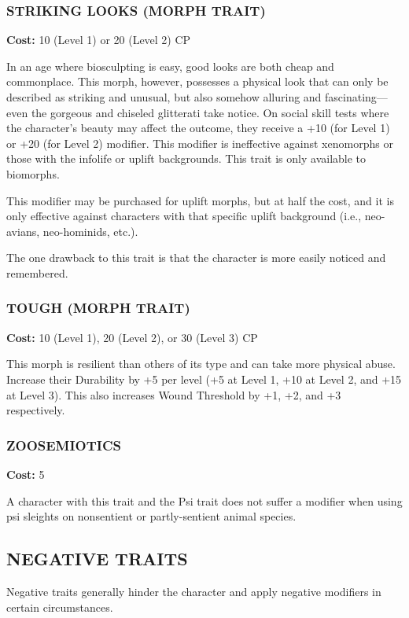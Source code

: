 \subsubsection{STRIKING LOOKS (MORPH TRAIT)}
\textbf{Cost:} 10 (Level 1) or 20 (Level 2) CP

In an age where biosculpting is easy, good looks are both cheap and
commonplace. This morph, however, possesses a physical look that can only be
described as striking and unusual, but also somehow alluring and
fascinating—even the gorgeous and chiseled glitterati take notice. On social
skill tests where the character’s beauty may affect the outcome, they receive a
+10 (for Level 1) or +20 (for Level 2) modifier. This modifier is ineffective
against xenomorphs or those with the infolife or uplift backgrounds. This trait
is only available to biomorphs.

This modifier may be purchased for uplift morphs, but at half the cost, and it
is only effective against characters with that specific uplift background
(i.e., neo-avians, neo-hominids, etc.).

The one drawback to this trait is that the character is more easily noticed and
remembered.

\subsubsection{TOUGH (MORPH TRAIT)}
\textbf{Cost:} 10 (Level 1), 20 (Level 2), or 30 (Level 3) CP

This morph is resilient than others of its type and can take more physical
abuse. Increase their Durability by +5 per level (+5 at Level 1, +10 at Level
2, and +15 at Level 3). This also increases Wound Threshold by +1, +2, and +3
respectively.

\subsubsection{ZOOSEMIOTICS}
\textbf{Cost:} 5

A character with this trait and the Psi trait does not suffer a modifier when
using psi sleights on nonsentient or partly-sentient animal species.

\subsection{NEGATIVE TRAITS}

Negative traits generally hinder the character and apply negative modifiers in
certain circumstances.

